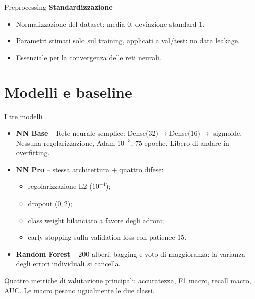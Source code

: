 \documentclass[aspectratio=169,11pt]{beamer}
\begin{document}
\begin{frame}{Preprocessing}
  \textbf{Standardizzazione}
    \begin{itemize}
      \item Normalizzazione del dataset: media $0$, deviazione standard $1$.
      \item Parametri stimati solo sul training, applicati a val/test: no data leakage.
      \item Essenziale per la convergenza delle reti neurali.
    \end{itemize}
  \end{frame}

\section{Modelli e baseline}
\begin{frame}{I tre modelli}
  \begin{itemize}
    \item \textbf{NN Base} -- Rete neurale semplice: Dense(32)$\to$Dense(16)$\to$
          sigmoide. Nessuna regolarizzazione, Adam $10^{-3}$, $75$ epoche.
          Libero di andare in overfitting.
    \item \textbf{NN Pro} -- stessa architettura $+$ quattro difese:
          \begin{itemize}
            \item[$\circ$] regolarizzazione L2 ($10^{-4}$);
            \item[$\circ$] dropout ($0{,}2$);
            \item[$\circ$] class weight bilanciato a favore degli adroni;
            \item[$\circ$] early stopping sulla validation loss con patience $15$.
          \end{itemize}
    \item \textbf{Random Forest} -- $200$ alberi, bagging e voto di
          maggioranza: la varianza degli errori individuali si cancella.
  \end{itemize}
  \vfill
  Quattro metriche di valutazione principali: accuratezza, F1
  macro, recall macro, AUC. Le macro pesano ugualmente le due classi.
\end{frame}
  
\end{document}
